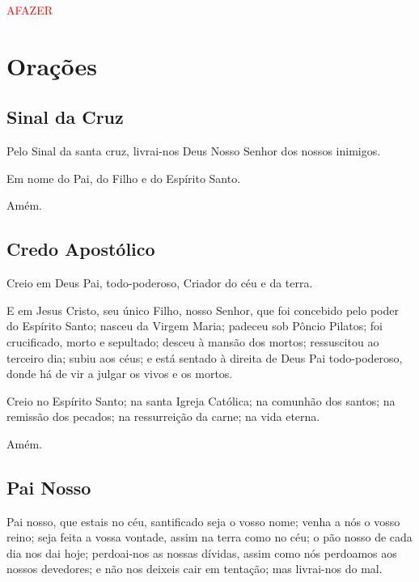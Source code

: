 \documentclass[10pt,a5paper]{book}
\newcommand{\TODO}{\textcolor{red}{\ttfamily AFAZER}}
\begin{document}
\begin{center}
    
\end{center}

\TODO


\chapter{Orações}


\section{Sinal da Cruz}

Pelo Sinal da santa cruz, livrai-nos Deus Nosso Senhor dos nossos inimigos.

Em nome do Pai, do Filho e do Espírito Santo.

Amém.


\section{Credo Apostólico}

Creio em Deus Pai, todo-poderoso, Criador do céu e da terra.

E em Jesus Cristo, seu único Filho, nosso Senhor,
que foi concebido pelo poder do Espírito Santo;
nasceu da Virgem Maria;
padeceu sob Pôncio Pilatos;
foi crucificado, morto e sepultado;
desceu à mansão dos mortos;
ressuscitou ao terceiro dia;
subiu aos céus;
e está sentado à direita de Deus Pai todo-poderoso,
donde há de vir a julgar os vivos e os mortos.

Creio no Espírito Santo;
na santa Igreja Católica;
na comunhão dos santos;
na remissão dos pecados;
na ressurreição da carne;
na vida eterna.

Amém.


\section{Pai Nosso}

Pai nosso, que estais no céu,
santificado seja o vosso nome;
venha a nós o vosso reino;
seja feita a vossa vontade,
assim na terra como no céu;
o pão nosso de cada dia nos dai hoje;
perdoai-nos as nossas dívidas,
assim como nós perdoamos aos nossos devedores;
e não nos deixeis cair em tentação;
mas livrai-nos do mal.
\end{document}
